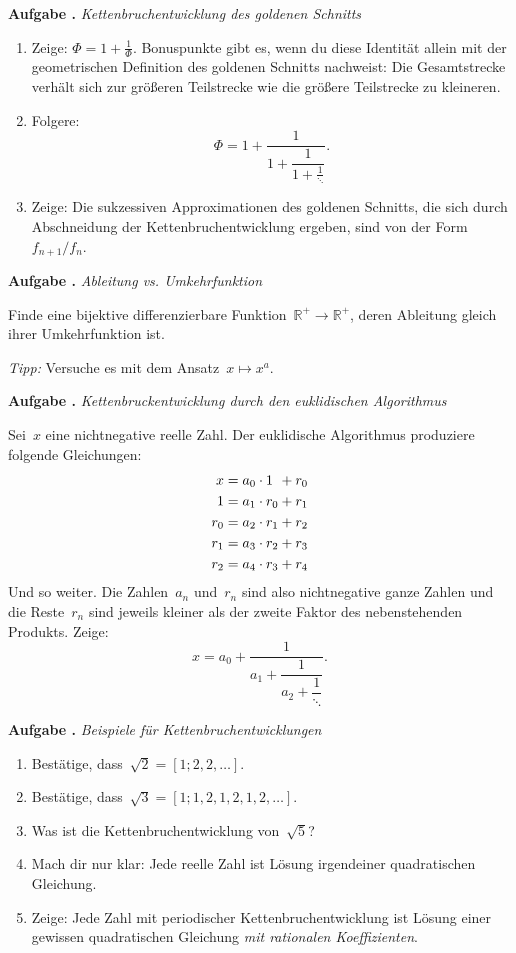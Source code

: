 \documentclass[a4paper,ngerman,twoside]{scrartcl}
\newlength{\aufgabenskip}
\newcounter{aufgabennummer}
\newenvironment{aufgabe}[1]{
  \addtocounter{aufgabennummer}{1}
  \textbf{Aufgabe \theaufgabennummer.} \emph{#1} \par
}{\vspace{\aufgabenskip}}
\newcommand{\RR}{\mathbb{R}}
\begin{document}
\begin{aufgabe}{Kettenbruchentwicklung des goldenen Schnitts}
\begin{enumerate}
\item Zeige: $\Phi = 1 + \frac{1}{\Phi}$. Bonuspunkte gibt es, wenn
du diese Identität allein mit der geometrischen Definition des goldenen
Schnitts nachweist: Die Gesamtstrecke verhält sich zur größeren Teilstrecke
wie die größere Teilstrecke zu kleineren.
\item Folgere:
\[ \Phi = 1 + \frac{1}{1 + \dfrac{1}{1 + \frac{1}{\ddots}}}. \]
\item Zeige: Die sukzessiven Approximationen des goldenen Schnitts, die sich
durch Abschneidung der Kettenbruchentwicklung ergeben, sind von der
Form~$f_{n+1}/f_n$.
\end{enumerate}
\end{aufgabe}

\begin{aufgabe}{Ableitung vs. Umkehrfunktion}
Finde eine bijektive differenzierbare Funktion~$\RR^+ \to \RR^+$, deren
Ableitung gleich ihrer Umkehrfunktion ist.

\emph{Tipp:} Versuche es mit dem Ansatz~$x \mapsto x^a$.
\end{aufgabe}

\begin{aufgabe}{Kettenbruckentwicklung durch den euklidischen Algorithmus}
Sei~$x$ eine nichtnegative reelle Zahl. Der euklidische Algorithmus produziere
folgende Gleichungen:
\begin{align*}
  x &= a_0 \cdot \sbox0{$r_0$}\makebox[\wd0][l]{$1$} + r_0 \\
  1 &= a_1 \cdot r_0 + r_1 \\
  r_0 &= a_2 \cdot r_1 + r_2 \\
  r_1 &= a_3 \cdot r_2 + r_3 \\
  r_2 &= a_4 \cdot r_3 + r_4
\end{align*}
Und so weiter. Die Zahlen~$a_n$ und~$r_n$ sind also nichtnegative ganze Zahlen
und die Reste~$r_n$ sind jeweils kleiner als der zweite Faktor des
nebenstehenden Produkts. Zeige:
\[ x = a_0 + \dfrac{1}{a_1 + \dfrac{1}{a_2 + \dfrac{1}{\ddots}}}. \]
\end{aufgabe}

\begin{aufgabe}{Beispiele für Kettenbruchentwicklungen}
\begin{enumerate}
\item Bestätige, dass~$\sqrt{2} = [1; 2, 2, \ldots]$.
\item Bestätige, dass~$\sqrt{3} = [1; 1, 2, 1, 2, 1, 2, \ldots]$.
\item Was ist die Kettenbruchentwicklung von~$\sqrt{5}$?
\item Mach dir nur klar: Jede reelle Zahl ist Lösung irgendeiner quadratischen
Gleichung.
\item Zeige: Jede Zahl mit periodischer Kettenbruchentwicklung ist Lösung einer
gewissen quadratischen Gleichung \emph{mit rationalen Koeffizienten}.
\end{enumerate}
\end{aufgabe}
\end{document}
